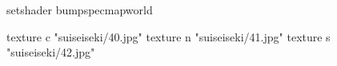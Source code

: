 setshader bumpspecmapworld

    texture c "suiseiseki/40.jpg"
    texture n "suiseiseki/41.jpg"
    texture s "suiseiseki/42.jpg"
